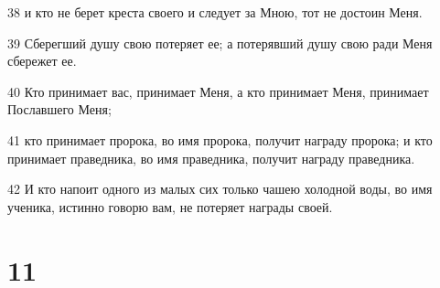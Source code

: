 \par 38 и кто не берет креста своего и следует за Мною, тот не достоин Меня.
\par 39 Сберегший душу свою потеряет ее; а потерявший душу свою ради Меня сбережет ее.
\par 40 Кто принимает вас, принимает Меня, а кто принимает Меня, принимает Пославшего Меня;
\par 41 кто принимает пророка, во имя пророка, получит награду пророка; и кто принимает праведника, во имя праведника, получит награду праведника.
\par 42 И кто напоит одного из малых сих только чашею холодной воды, во имя ученика, истинно говорю вам, не потеряет награды своей.

\chapter{11}

